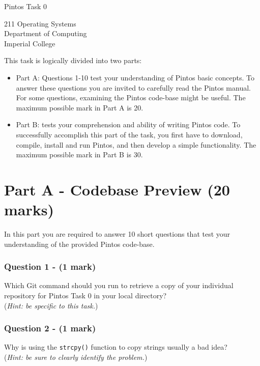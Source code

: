 \documentclass[a4paper,12pt]{article}
\begin{document}
\small

\begin{center}
\begin{LARGE}
Pintos Task 0
\end{LARGE}
\end{center}

\begin{center}
211 Operating Systems \\
Department of Computing \\
Imperial College
\end{center}

This task is logically divided into two parts:
\begin{itemize}
\item Part A: Questions 1-10 test your understanding of Pintos basic concepts. 
      To answer these questions you are invited to carefully read the Pintos manual. 
      For some questions, examining the Pintos code-base might be useful. 
      The maximum possible mark in Part A is 20.
      
\item Part B: tests your comprehension and ability of writing Pintos code. 
      To successfully accomplish this part of the task, you first have to download, compile, install and run Pintos, and then develop a simple functionality. 
      The maximum possible mark in Part B is 30. 
\end{itemize}

\section*{Part A - Codebase Preview (20 marks)}
In this part you are required to answer 10 short questions that test your understanding of the provided Pintos code-base.

\subsubsection*{Question 1 - (1 mark)}
Which Git command should you run to retrieve a copy of your individual repository for Pintos Task 0 in your local directory?\\
(\textit{Hint: be specific to this task.})

\subsubsection*{Question 2 - (1 mark)}
Why is using the {\tt strcpy()} function to copy strings usually a bad idea? \\
(\textit{Hint: be sure to clearly identify the problem.})
\end{document}
